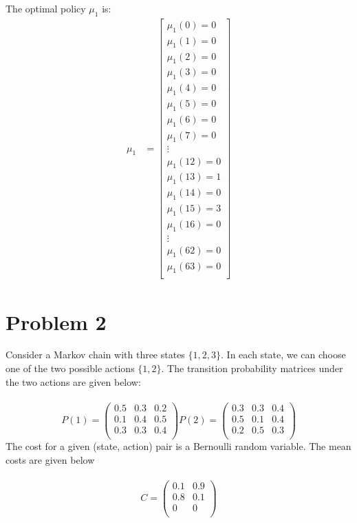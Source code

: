 \documentclass{article}
\begin{document}
The optimal policy $\mu_1$ is: \\
\begin{align}
\mu_1 &= \begin{bmatrix}
    \mu_1(0)=0 \\
    \mu_1(1)=0 \\
    \mu_1(2)=0 \\
    \mu_1(3)=0 \\
    \mu_1(4)=0 \\
    \mu_1(5)=0 \\
    \mu_1(6)=0 \\
    \mu_1(7)=0 \\
    \vdots \\
    \mu_1(12)=0 \\
    \mu_1(13)=1 \\
    \mu_1(14)=0 \\
    \mu_1(15)=3 \\
    \mu_1(16)=0 \\
    \vdots \\
    \mu_1(62)=0 \\
    \mu_1(63)=0 \\
        \end{bmatrix}
\end{align}

\pagebreak

\section{Problem 2}
Consider a Markov chain with three states $\{1, 2, 3\}$. In each state, we can choose one of the two
possible actions $\{1, 2\}$. The transition probability matrices under the two actions are given below: \\\\

\begin{equation}
    P(1) =
    \begin{pmatrix}
        0.5 & 0.3 & 0.2 \\
        0.1 & 0.4 & 0.5 \\
        0.3 & 0.3 & 0.4 \\
    \end{pmatrix}
    P(2) =
    \begin{pmatrix}
        0.3 & 0.3 & 0.4 \\
        0.5 & 0.1 & 0.4 \\
        0.2 & 0.5 & 0.3 \\
    \end{pmatrix}
\end{equation}
The cost for a given (state, action) pair is a Bernoulli random variable. The mean costs are given
below \\\\
\begin{equation}
    C =
    \begin{pmatrix}
        0.1 & 0.9 \\
        0.8 & 0.1 \\
        0 & 0 \\
    \end{pmatrix}
\end{equation}
\end{document}
